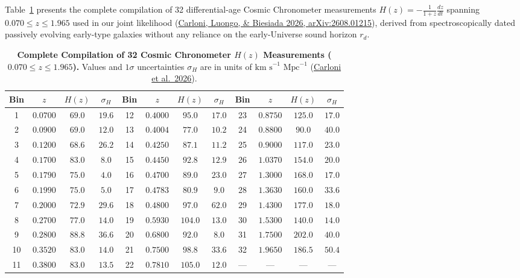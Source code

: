 \documentclass[aps,prd,preprint,superscriptaddress,nofootinbib]{revtex4-2}
\begin{document}
Table~\ref{m:tab:cc_full_32} presents the complete compilation of 32 differential-age Cosmic Chronometer measurements $H(z) = -\frac{1}{1+z}\frac{dz}{dt}$ spanning $0.070 \le z \le 1.965$ used in our joint likelihood (\href{https://arxiv.org/pdf/2608.01215}{Carloni, Luongo, \& Biesiada 2026, arXiv:2608.01215}), derived from spectroscopically dated passively evolving early-type galaxies without any reliance on the early-Universe sound horizon $r_d$.

\begin{table}[!htbp]
\centering
\caption{\textbf{Complete Compilation of 32 Cosmic Chronometer $H(z)$ Measurements ($0.070 \le z \le 1.965$).} Values and $1\sigma$ uncertainties $\sigma_H$ are in units of $\text{km s}^{-1}\text{ Mpc}^{-1}$ (\href{https://arxiv.org/pdf/2608.01215}{Carloni et al.\ 2026}).}
\label{m:tab:cc_full_32}
\vspace{3pt}
\footnotesize
\setlength{\tabcolsep}{5.5pt}
\renewcommand{\arraystretch}{1.12}
\begin{tabular}{cccc|cccc|cccc}
\toprule\rowcolor{tableheadbg}
\textbf{Bin} & $z$ & $H(z)$ & $\sigma_H$ & \textbf{Bin} & $z$ & $H(z)$ & $\sigma_H$ & \textbf{Bin} & $z$ & $H(z)$ & $\sigma_H$ \\
\midrule
1  & $0.0700$ & $69.0$ & $19.6$ & 12 & $0.4000$ & $95.0$  & $17.0$ & 23 & $0.8750$ & $125.0$ & $17.0$ \\
2  & $0.0900$ & $69.0$ & $12.0$ & 13 & $0.4004$ & $77.0$  & $10.2$ & 24 & $0.8800$ & $90.0$  & $40.0$ \\
3  & $0.1200$ & $68.6$ & $26.2$ & 14 & $0.4250$ & $87.1$  & $11.2$ & 25 & $0.9000$ & $117.0$ & $23.0$ \\
4  & $0.1700$ & $83.0$ & $8.0$  & 15 & $0.4450$ & $92.8$  & $12.9$ & 26 & $1.0370$ & $154.0$ & $20.0$ \\
5  & $0.1790$ & $75.0$ & $4.0$  & 16 & $0.4700$ & $89.0$  & $23.0$ & 27 & $1.3000$ & $168.0$ & $17.0$ \\
6  & $0.1990$ & $75.0$ & $5.0$  & 17 & $0.4783$ & $80.9$  & $9.0$  & 28 & $1.3630$ & $160.0$ & $33.6$ \\
7  & $0.2000$ & $72.9$ & $29.6$ & 18 & $0.4800$ & $97.0$  & $62.0$ & 29 & $1.4300$ & $177.0$ & $18.0$ \\
8  & $0.2700$ & $77.0$ & $14.0$ & 19 & $0.5930$ & $104.0$ & $13.0$ & 30 & $1.5300$ & $140.0$ & $14.0$ \\
9  & $0.2800$ & $88.8$ & $36.6$ & 20 & $0.6800$ & $92.0$  & $8.0$  & 31 & $1.7500$ & $202.0$ & $40.0$ \\
10 & $0.3520$ & $83.0$ & $14.0$ & 21 & $0.7500$ & $98.8$  & $33.6$ & 32 & $1.9650$ & $186.5$ & $50.4$ \\
11 & $0.3800$ & $83.0$ & $13.5$ & 22 & $0.7810$ & $105.0$ & $12.0$ & --- & --- & --- & --- \\
\bottomrule
\end{tabular}
\end{table}
\end{document}
